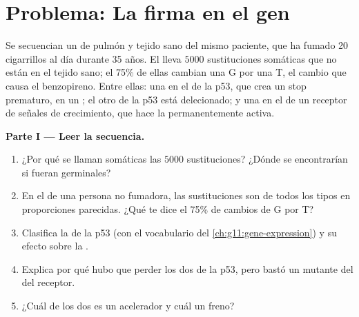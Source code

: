 \section{Problema: La firma en el gen}

\begin{problem}
\label{pb:g11:cancer:1}
Se secuencian un  de pulmón y tejido sano del mismo paciente, que
ha fumado 20 cigarrillos al día durante 35 años. El  lleva
$\num{5000}$ sustituciones somáticas que no están en el tejido sano; el
75\% de ellas cambian una G por una T, el cambio que causa el
benzopireno. Entre ellas: una en el  de la p53, que crea un stop
prematuro, en un ; el otro  de la p53 está delecionado; y una
en el  de un receptor de señales de crecimiento, que hace la
 permanentemente activa.

\medskip
\noindent\textbf{Parte I --- Leer la secuencia.}
\begin{enumerate}
  \item ¿Por qué se llaman somáticas las $\num{5000}$ sustituciones?
        ¿Dónde se encontrarían si fueran germinales?
  \item En el  de una persona no fumadora, las sustituciones son
        de todos los tipos en proporciones parecidas. ¿Qué te dice el
        75\% de cambios de G por T?
  \item Clasifica la  de la p53 (con el vocabulario del
        \cref{ch:g11:gene-expression}) y su efecto sobre la .
  \item Explica por qué hubo que perder los dos  de la p53, pero
        bastó un  mutante del  del receptor.
  \item ¿Cuál de los dos  es un acelerador y cuál un freno?
\end{enumerate}


\end{problem}
